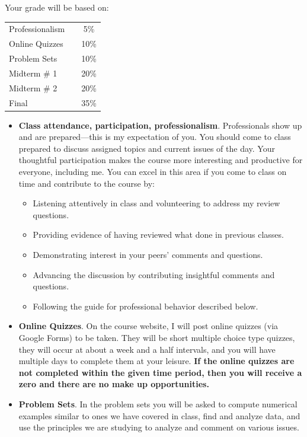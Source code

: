 \documentclass[12pt,pdftex,twoside,letterpaper]{exam}
\begin{document}
Your grade will be based on:
\begin{center}
\begin{tabular}{lcc}
    Professionalism &\hspace*{0.50in}&   5\%  \\
    Online Quizzes && 10\% \\
    Problem Sets &&  10\% \\
    Midterm \# 1 &&  20\% \\
    Midterm \# 2 &&  20\% \\
    Final &&  35\% \\
\end{tabular}
\end{center}
\begin{itemize}
\item \textbf{Class attendance, participation, professionalism}. Professionals show up and are prepared---this is my expectation of you. You should come to class prepared to discuss assigned topics and current issues of the day. Your thoughtful participation makes the course more interesting and productive for everyone, including me. You can excel in this area if you come to class on time and contribute to the course by:
\begin{itemize}
\item Listening attentively in class and volunteering to address my review questions.
\item Providing evidence of having reviewed what done in previous classes.
\item Demonstrating interest in your peers' comments and questions.
\item Advancing the discussion by contributing insightful comments and questions.
\item Following the guide for professional behavior described below.
\end{itemize}

\item \textbf{Online Quizzes}. On the course website, I will post online quizzes (via Google Forms) to be taken. They will be short multiple choice type quizzes, they will occur at about a week and a half intervals, and you will have multiple days to complete them at your leisure. \textbf{If the online quizzes are not completed within the given time period, then you will receive a zero and there are no make up opportunities.}

\item \textbf{Problem Sets}. In the problem sets you will be asked to compute numerical examples similar to ones we have covered in class, find and analyze data, and use the principles we are studying to analyze and comment on various issues.


\end{itemize}
\end{document}

